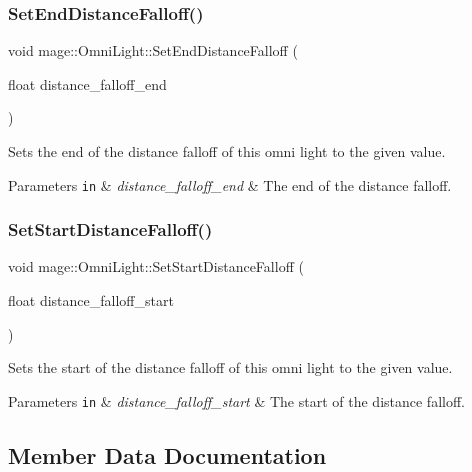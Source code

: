 \subsubsection{\texorpdfstring{Set\+End\+Distance\+Falloff()}{SetEndDistanceFalloff()}}
{\footnotesize\ttfamily void mage\+::\+Omni\+Light\+::\+Set\+End\+Distance\+Falloff (\begin{DoxyParamCaption}\item[{float}]{distance\+\_\+falloff\+\_\+end }\end{DoxyParamCaption})\hspace{0.3cm}{\ttfamily [noexcept]}}

Sets the end of the distance falloff of this omni light to the given value.


\begin{DoxyParams}[1]{Parameters}
\mbox{\tt in}  & {\em distance\+\_\+falloff\+\_\+end} & The end of the distance falloff. \\
\hline
\end{DoxyParams}
\hypertarget{classmage_1_1_omni_light_ac7d7dbdbaf9abdc6ee3c660d2354c39d}{}\label{classmage_1_1_omni_light_ac7d7dbdbaf9abdc6ee3c660d2354c39d} 
\subsubsection{\texorpdfstring{Set\+Start\+Distance\+Falloff()}{SetStartDistanceFalloff()}}
{\footnotesize\ttfamily void mage\+::\+Omni\+Light\+::\+Set\+Start\+Distance\+Falloff (\begin{DoxyParamCaption}\item[{float}]{distance\+\_\+falloff\+\_\+start }\end{DoxyParamCaption})\hspace{0.3cm}{\ttfamily [noexcept]}}

Sets the start of the distance falloff of this omni light to the given value.


\begin{DoxyParams}[1]{Parameters}
\mbox{\tt in}  & {\em distance\+\_\+falloff\+\_\+start} & The start of the distance falloff. \\
\hline
\end{DoxyParams}


\subsection{Member Data Documentation}
\hypertarget{classmage_1_1_omni_light_a4ee5cc4103305dc96b43d6286858ef74}{}\label{classmage_1_1_omni_light_a4ee5cc4103305dc96b43d6286858ef74} 
